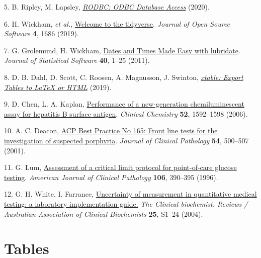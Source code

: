 \documentclass[review]{elsarticle}
\begin{document}
\hypertarget{citeproc_bib_item_5}{5.  B. Ripley, M. Lapsley, \textit{\href{https://CRAN.R-project.org/package=RODBC}{RODBC: ODBC Database Access}} (2020).}

\hypertarget{citeproc_bib_item_6}{6.  H. Wickham, \textit{et al.}, \href{https://doi.org/10.21105/joss.01686}{Welcome to the tidyverse}. \textit{Journal of Open Source Software} \textbf{4}, 1686 (2019).}

\hypertarget{citeproc_bib_item_7}{7.  G. Grolemund, H. Wickham, \href{https://www.jstatsoft.org/v40/i03/}{Dates and Times Made Easy with lubridate}. \textit{Journal of Statistical Software} \textbf{40}, 1–25 (2011).}

\hypertarget{citeproc_bib_item_8}{8.  D. B. Dahl, D. Scott, C. Roosen, A. Magnusson, J. Swinton, \textit{\href{https://CRAN.R-project.org/package=xtable}{xtable: Export Tables to LaTeX or HTML}} (2019).}

\hypertarget{citeproc_bib_item_9}{9.  D. Chen, L. A. Kaplan, \href{https://doi.org/10.1373/clinchem.2005.064063}{Performance of a new-generation chemiluminescent assay for hepatitis B surface antigen}. \textit{Clinical Chemistry} \textbf{52}, 1592–1598 (2006).}

\hypertarget{citeproc_bib_item_10}{10.  A. C. Deacon, \href{https://doi.org/10.1136/jcp.54.7.500}{ACP Best Practice No 165: Front line tests for the investigation of suspected porphyria}. \textit{Journal of Clinical Pathology} \textbf{54}, 500–507 (2001).}

\hypertarget{citeproc_bib_item_11}{11.  G. Lum, \href{https://doi.org/10.1093/ajcp/106.3.390}{Assessment of a critical limit protocol for point-of-care glucose testing}. \textit{American Journal of Clinical Pathology} \textbf{106}, 390–395 (1996).}

\hypertarget{citeproc_bib_item_12}{12.  G. H. White, I. Farrance, \href{https://www.ncbi.nlm.nih.gov/pubmed/18650962}{Uncertainty of measurement in quantitative medical testing: a laboratory implementation guide.} \textit{The Clinical biochemist. Reviews / Australian Association of Clinical Biochemists} \textbf{25}, S1–24 (2004).}
\clearpage 

\section*{Tables}
\label{sec:org484e822}
\end{document}
